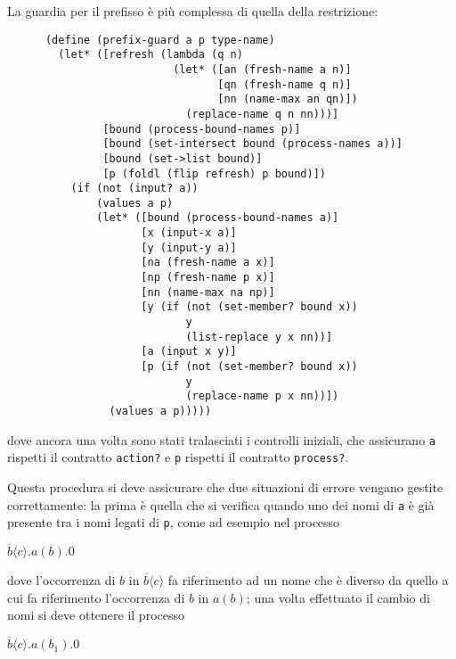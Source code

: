 La guardia per il prefisso \`e pi\`u complessa di quella della
restrizione:

\begin{lstlisting}
      (define (prefix-guard a p type-name)
        (let* ([refresh (lambda (q n)
                          (let* ([an (fresh-name a n)]
                                 [qn (fresh-name q n)]
                                 [nn (name-max an qn)])
                            (replace-name q n nn)))]
               [bound (process-bound-names p)]
               [bound (set-intersect bound (process-names a))]
               [bound (set->list bound)]
               [p (foldl (flip refresh) p bound)])
          (if (not (input? a))
              (values a p)
              (let* ([bound (process-bound-names a)]
                     [x (input-x a)]
                     [y (input-y a)]
                     [na (fresh-name a x)]
                     [np (fresh-name p x)]
                     [nn (name-max na np)]
                     [y (if (not (set-member? bound x))
                            y
                            (list-replace y x nn))]
                     [a (input x y)]
                     [p (if (not (set-member? bound x))
                            y
                            (replace-name p x nn))])
                (values a p)))))
\end{lstlisting}

dove ancora una volta sono stati tralasciati i controlli iniziali, che
assicurano \lstinline{a} rispetti il contratto \lstinline{action?} e
\lstinline{p} rispetti il contratto \lstinline{process?}.

Questa procedura si deve assicurare che due situazioni di errore vengano
gestite correttamente: la prima \`e quella che si verifica quando uno dei
nomi di \lstinline{a} \`e gi\`a presente tra i nomi legati di
\lstinline{p}, come ad esempio nel processo

\begin{pilisting}
$
    \overline{b}\langle c\rangle.a(b).0
$
\end{pilisting}

dove l'occorrenza di $b$ in $\overline{b}\langle c\rangle$ fa riferimento
ad un nome che \`e diverso da quello a cui fa riferimento l'occorrenza di
$b$ in $a(b)$; una volta effettuato il cambio di nomi si deve ottenere il
processo

\begin{pilisting}
$
    \overline{b}\langle c\rangle.a(b_1).0
$
\end{pilisting}


